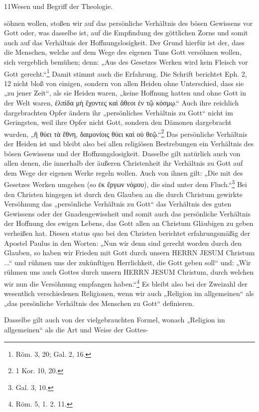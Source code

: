 11\hfill Wesen und Begriff der Theologie.\par\par söhnen wollen, stoßen wir auf das persönliche Verhältnis des bösen Gewissens vor Gott oder, was dasselbe ist, auf die Empfindung des göttlichen Zorns und somit auch auf das Verhältnis der Hoffnungslosigkeit. Der Grund hierfür ist der, dass die Menschen, welche auf dem Wege des eigenen Tuns Gott versöhnen wollen, sich vergeblich bemühen; denn: „Aus des Gesetzes Werken wird kein Fleisch vor Gott gerecht.“\footnote{Röm. 3, 20; Gal. 2, 16.} Damit stimmt auch die Erfahrung. Die Schrift berichtet Eph. 2, 12 nicht bloß von einigen, sondern von allen Heiden ohne Unterschied, dass sie „zu jener Zeit“, als sie Heiden waren, „keine Hoffnung hatten und ohne Gott in der Welt waren, \textgreek{ἐλπίδα μὴ ἔχοντες καὶ ἄθεοι ἐν τῷ κόσμῳ}.“ Auch ihre reichlich dargebrachten Opfer ändern ihr „persönliches Verhältnis zu Gott“ nicht im Geringsten, weil ihre Opfer nicht Gott, sondern den Dämonen dargebracht wurden, „\textgreek{ἢ θύει τὰ ἔθνη, δαιμονίοις θύει καὶ οὐ θεῷ}.“\footnote{1 Kor. 10, 20.} Das persönliche Verhältnis der Heiden ist und bleibt also bei allen religiösen Bestrebungen ein Verhältnis des bösen Gewissens und der Hoffnungslosigkeit. Dasselbe gilt natürlich auch von allen denen, die innerhalb der äußeren Christenheit ihr Verhältnis zu Gott auf dem Wege der eigenen Werke regeln wollen. Auch von ihnen gilt: „Die mit des Gesetzes Werken umgehen (so \textgreek{ἐκ ἔργων νόμου}), die sind unter dem Fluch.“\footnote{Gal. 3, 10.} Bei den Christen hingegen ist durch den Glauben an die durch Christum gewirkte Versöhnung das „persönliche Verhältnis zu Gott“ das Verhältnis des guten Gewissens oder der Gnadengewissheit und somit auch das persönliche Verhältnis der Hoffnung des ewigen Lebens, das Gott allen an Christum Gläubigen zu geben verheißen hat. Diesen status quo bei den Christen berichtet erfahrungsmäßig der Apostel Paulus in den Worten: „Nun wir denn sind gerecht worden durch den Glauben, so haben wir Frieden mit Gott durch unsern HERRN JESUM Christum ...“ und rühmen uns der zukünftigen Herrlichkeit, die Gott geben soll“ und: „Wir rühmen uns auch Gottes durch unsern HERRN JESUM Christum, durch welchen wir nun die Versöhnung empfangen haben.“\footnote{Röm. 5, 1. 2. 11.} Es bleibt also bei der Zweizahl der wesentlich verschiedenen Religionen, wenn wir auch „Religion im allgemeinen“ als „das persönliche Verhältnis des Menschen zu Gott“ definieren.\par\par Dasselbe gilt auch von der vielgebrauchten Formel, wonach „Religion im allgemeinen“ als die Art und Weise der Gottes-